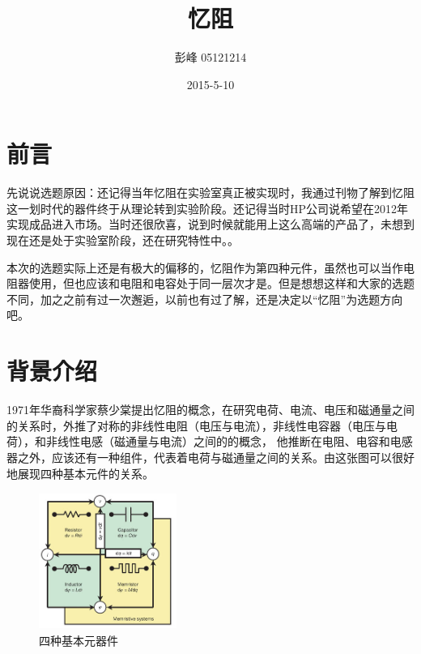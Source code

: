 \documentclass[UTF8]{article}
\begin{document}
 



\renewcommand{\contentsname}{\center{\huge 目\ \ \ 录}}
\author{    彭峰     05121214   }
 \date{2015-5-10}
\title{忆阻}  %
\titlelabel{\S\thetitle\quad}

\tableofcontents

\maketitle

\section{前言}

先说说选题原因：还记得当年忆阻在实验室真正被实现时，我通过刊物了解到忆阻这一划时代的器件终于从理论转到实验阶段。还记得当时HP公司说希望在2012年实现成品进入市场。当时还很欣喜，说到时候就能用上这么高端的产品了，未想到现在还是处于实验室阶段，还在研究特性中。。

本次的选题实际上还是有极大的偏移的，忆阻作为第四种元件，虽然也可以当作电阻器使用，但也应该和电阻和电容处于同一层次才是。但是想想这样和大家的选题不同，加之之前有过一次邂逅，以前也有过了解，还是决定以“忆阻”为选题方向吧。

\section{背景介绍}
1971年华裔科学家蔡少棠提出忆阻的概念，在研究电荷、电流、电压和磁通量之间的关系时，外推了对称的非线性电阻（电压与电流），非线性电容器（电压与电荷），和非线性电感（磁通量与电流）之间的的概念，
他推断在电阻、电容和电感器之外，应该还有一种组件，代表着电荷与磁通量之间的关系。由这张图可以很好地展现四种基本元件的关系。


\begin{figure}[htbp]
\centering
\includegraphics[width=1.77in,height=1.75in]{pic/memristor01.jpeg}
\caption{四种基本元器件}
\label{fig:3}
\end{figure}
\end{document}
